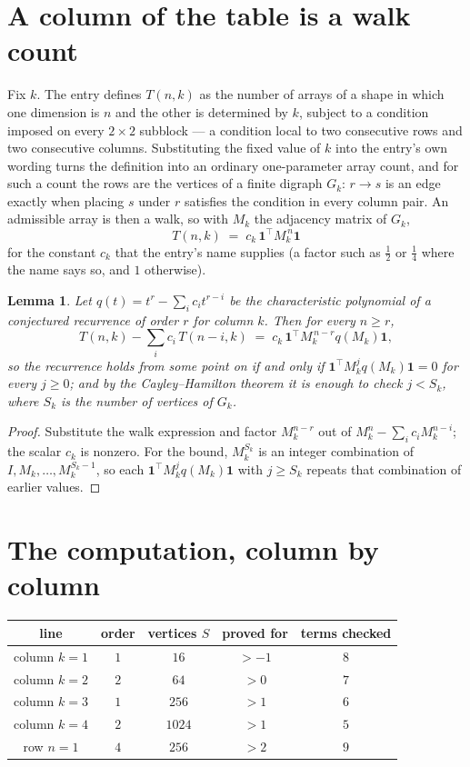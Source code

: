 \documentclass[11pt,a4paper]{article}
\theoremstyle{plain}
\newtheorem{lemma}[theorem]{Lemma}
\theoremstyle{definition}
\begin{document}
\section{A column of the table is a walk count}

Fix $k$. The entry defines $T(n,k)$ as the number of arrays of a shape in which one dimension
is $n$ and the other is determined by $k$, subject to a condition imposed on every
$2\times2$ subblock --- a condition local to two consecutive rows and two consecutive columns.
Substituting the fixed value of $k$ into the entry's own wording turns the definition into an
ordinary one-parameter array count, and for such a count the rows are the vertices of a finite
digraph $G_k$: $r\to s$ is an edge exactly when placing $s$ under $r$ satisfies the condition
in every column pair. An admissible array is then a walk, so with $M_k$ the adjacency matrix
of $G_k$,
\[
T(n,k)\;=\;c_k\,\mathbf{1}^{\!\top}M_k^{\,n}\mathbf{1}
\]
for the constant $c_k$ that the entry's name supplies (a factor such as $\tfrac12$ or
$\tfrac14$ where the name says so, and $1$ otherwise).

\begin{lemma}\label{lem:crit}
Let $q(t)=t^{r}-\sum_i c_it^{r-i}$ be the characteristic polynomial of a conjectured
recurrence of order $r$ for column $k$. Then for every $n\ge r$,
\[
T(n,k)-\sum_i c_i\,T(n-i,k)\;=\;c_k\,\mathbf{1}^{\!\top}M_k^{\,n-r}q(M_k)\mathbf{1},
\]
so the recurrence holds from some point on if and only if
$\mathbf{1}^{\!\top}M_k^{j}q(M_k)\mathbf{1}=0$ for every $j\ge0$; and by the
Cayley--Hamilton theorem it is enough to check $j<S_k$, where $S_k$ is the number of vertices
of $G_k$.
\end{lemma}

\begin{proof}
Substitute the walk expression and factor $M_k^{n-r}$ out of $M_k^{n}-\sum_ic_iM_k^{n-i}$;
the scalar $c_k$ is nonzero. For the bound, $M_k^{S_k}$ is an integer combination of
$I,M_k,\dots,M_k^{S_k-1}$, so each $\mathbf{1}^{\!\top}M_k^{j}q(M_k)\mathbf{1}$ with
$j\ge S_k$ repeats that combination of earlier values.
\end{proof}

\section{The computation, column by column}

\begin{center}
\begin{tabular}{ccccc}
line & order & vertices $S$ & proved for & terms checked \\ \hline
column $k$$=1$ & $1$ & $16$ & $>-1$ & $8$ \\
column $k$$=2$ & $2$ & $64$ & $>0$ & $7$ \\
column $k$$=3$ & $1$ & $256$ & $>1$ & $6$ \\
column $k$$=4$ & $2$ & $1024$ & $>1$ & $5$ \\
row $n$$=1$ & $4$ & $256$ & $>2$ & $9$ \\
\end{tabular}
\end{center}
\end{document}
